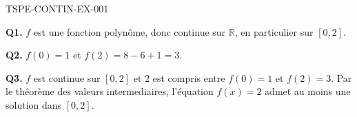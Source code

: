 \begin{corrige}{TSPE-CONTIN-EX-001}

\textbf{Q1.} $f$ est une fonction polynôme, donc continue sur $\mathbb{R}$, en particulier sur $[0,2]$.

\textbf{Q2.} $f(0) = 1$ et $f(2) = 8 - 6 + 1 = 3$.

\textbf{Q3.} $f$ est continue sur $[0,2]$ et $2$ est compris entre $f(0)=1$ et $f(2)=3$. Par le théorème des valeurs intermediaires, l'équation $f(x)=2$ admet au moins une solution dans $[0,2]$.

\end{corrige}

